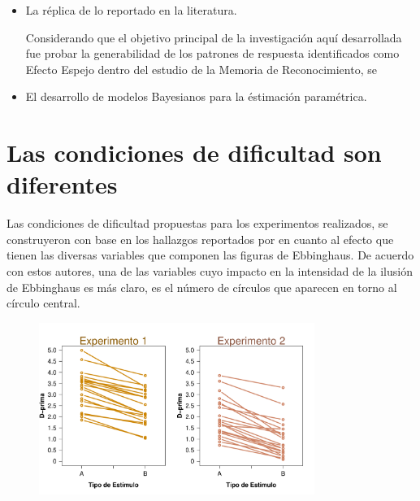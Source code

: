\begin{itemize}
\item La réplica de lo reportado en la literatura.

Considerando que el objetivo principal de la investigación aquí desarrollada fue probar la generabilidad de los patrones de respuesta identificados como Efecto Espejo dentro del estudio de la Memoria de Reconocimiento, se

\item El desarrollo de modelos Bayesianos para la éstimación paramétrica.



\end{itemize}

\section{Las condiciones de dificultad son diferentes}

Las condiciones de dificultad propuestas para los experimentos realizados, se construyeron con base en los hallazgos reportados por \parencite{Masaro1971} en cuanto al efecto que tienen las diversas variables que componen las figuras de Ebbinghaus. De acuerdo con estos autores, una de las variables cuyo impacto en la intensidad de la ilusión de Ebbinghaus es más claro, es el número de círculos que aparecen en torno al círculo central.



\begin{figure}[th]
\centering
\includegraphics[width=0.80\textwidth]{Figures/Diff_D_E1yE2}
\caption[Diferencias en Discriminabilidad (Comprobando diferencias entre condiciones)]{ }
\label{fig:Diff_D}
\end{figure}


